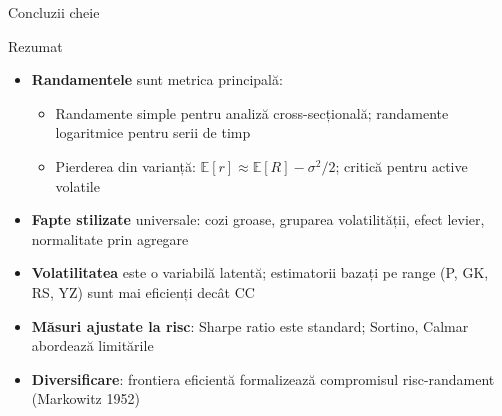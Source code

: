 \documentclass[9pt, aspectratio=169, t]{beamer}
\theoremstyle{definition}
\newcommand{\E}{\mathbb{E}}
\begin{document}
\begin{frame}{Concluzii cheie}
    \begin{block}{Rezumat}
    \small
    \begin{itemize}
        \item \textbf{Randamentele} sunt metrica principală:
        \begin{itemize}
            \item Randamente simple pentru analiză cross-secțională; randamente logaritmice pentru serii de timp
            \item Pierderea din varianță: $\E[r] \approx \E[R] - \sigma^2/2$; critică pentru active volatile
        \end{itemize}
        \item \textbf{Fapte stilizate} universale: cozi groase, gruparea volatilității, efect levier, normalitate prin agregare
        \item \textbf{Volatilitatea} este o variabilă latentă; estimatorii bazați pe range (P, GK, RS, YZ) sunt mai eficienți decât CC
        \item \textbf{Măsuri ajustate la risc}: Sharpe ratio este standard; Sortino, Calmar abordează limitările
        \item \textbf{Diversificare}: frontiera eficientă formalizează compromisul risc-randament (Markowitz 1952)
    \end{itemize}
    \end{block}
\end{frame}
\end{document}
